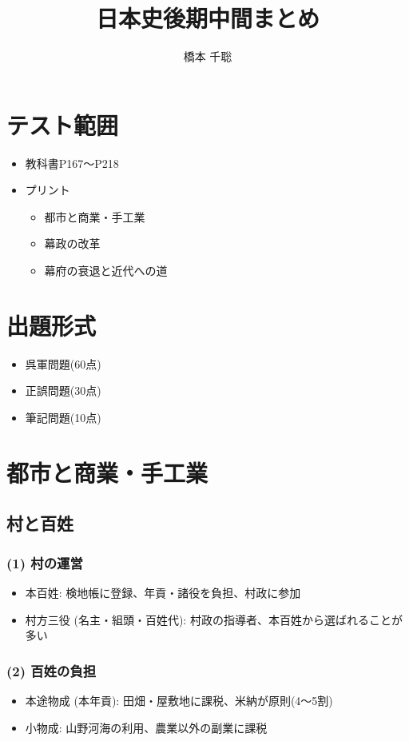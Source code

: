 \documentclass[a4paper,11pt]{jsarticle}
\title{日本史後期中間まとめ}
\date{\empty}
\author{橋本 千聡}
\begin{document}
\maketitle
\section*{テスト範囲}
\begin{itemize}
  \item 教科書P167～P218
  \item プリント
  \begin{itemize}
    \item 都市と商業・手工業
    \item 幕政の改革
    \item 幕府の衰退と近代への道
  \end{itemize}
\end{itemize}

\section*{出題形式}
\begin{itemize}
  \item 呉軍問題(60点)
  \item 正誤問題(30点)
  \item 筆記問題(10点)
\end{itemize}

\newpage

\section*{都市と商業・手工業}
\subsection*{村と百姓}
\subsubsection*{(1) 村の運営}
\begin{itemize}
  \item 本百姓: 検地帳に登録、年貢・諸役を負担、村政に参加
  \item 村方三役 (名主・組頭・百姓代): 村政の指導者、本百姓から選ばれることが多い
\end{itemize}

\subsubsection*{(2) 百姓の負担}
\begin{itemize}
  \item 本途物成 (本年貢): 田畑・屋敷地に課税、米納が原則(4〜5割)
  \item 小物成: 山野河海の利用、農業以外の副業に課税
\end{itemize}
\end{document}
